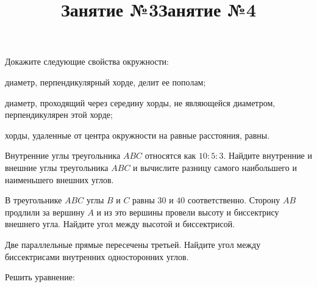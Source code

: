 \newpage
\title{Занятие №3}
\begin{listofex}
	\item Докажите следующие свойства окружности:
	\begin{enumcols}[itemcolumns=1]
		\item диаметр, перпендикулярный хорде, делит ее пополам;
		\item диаметр, проходящий через середину хорды, не являющейся диаметром, перпендикулярен этой хорде;
		\item хорды, удаленные от центра окружности на равные расстояния, равны.
	\end{enumcols}
	\item {}
	\item {}
	\item {}
	\item {}
	\item {}
	\item {}
	\item {}
\end{listofex}
\newpage
\title{Занятие №4}
\begin{listofex}
	\item Внутренние углы треугольника \( ABC \) относятся как \( 10:5:3 \). Найдите внутренние и внешние углы треугольника \( ABC \) и вычислите разницу самого наибольшего и наименьшего внешних углов. 
	\item В треугольнике \( ABC \) углы \( B \) и \( C \) равны \( 30 \) и \( 40 \) соответственно. Сторону \( AB \) продлили за вершину \( A \) и из это вершины провели высоту и биссектрису внешнего угла. Найдите угол между высотой и биссектрисой. 
	\item Две параллельные прямые пересечены третьей. Найдите угол между биссектрисами внутренних односторонних углов.
	\item {}
	\item {}
	\item {}
	\item {}
	\item Решить уравнение:
	\begin{enumcols}[itemcolumns=2]
		\item {}
		\item {}
	\end{enumcols}
\end{listofex}

